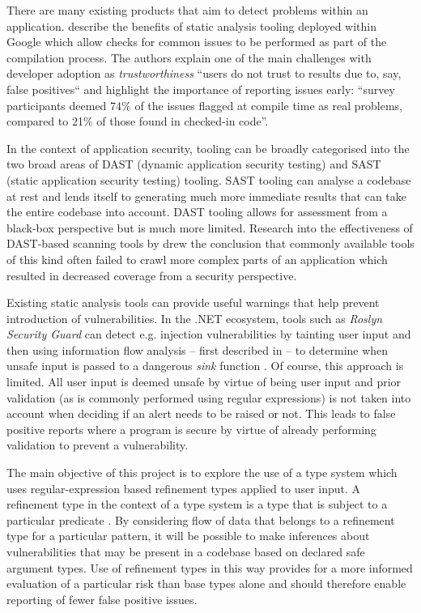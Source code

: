 \documentclass[a4paper,openany,12pt]{book}
\begin{document}
There are many existing products that aim to detect problems within an application. \citet{sadowski2018lessons} describe the benefits of static analysis tooling deployed within Google which allow checks for common issues to be performed as part of the compilation process. The authors explain one of the main challenges with developer adoption as \emph{trustworthiness} ``users do not trust to results due to, say, false positives`` and highlight the importance of reporting issues early: ``survey participants deemed 74\% of the issues flagged at compile time as real problems, compared to 21\% of those found in checked-in code''.

In the context of application security, tooling can be broadly categorised into the two broad areas of DAST (dynamic application security testing) and SAST (static application security testing) tooling. SAST tooling can analyse a codebase at rest and lends itself to generating much more immediate results that can take the entire codebase into account. DAST tooling allows for assessment from a black-box perspective but is much more limited. Research into the effectiveness of DAST-based scanning tools by \citet{doupe2010johnny} drew the conclusion that commonly available tools of this kind often failed to crawl more complex parts of an application which resulted in decreased coverage from a security perspective.

Existing static analysis tools can provide useful warnings that help prevent introduction of vulnerabilities.
In the .NET ecosystem, tools such as \emph{Roslyn Security Guard} can detect e.g. injection vulnerabilities by tainting
user input and then using information flow analysis -- first described in \cite{denning1977certification} -- to
determine when unsafe input is passed to a dangerous \emph{sink} function \citep{rosylynsecguard}.
Of course, this approach is limited.
All user input is deemed unsafe by virtue of being user input and prior validation (as is commonly performed using
regular expressions) is not taken into account when deciding if an alert needs to be raised or not.
This leads to false positive reports where a program is secure by virtue of already performing validation to prevent a
vulnerability.

The main objective of this project is to explore the use of a type system which uses regular-expression based refinement
types applied to user input.
A refinement type in the context of a type system is a type that is subject to a particular predicate \citep[p.
207]{benjaminpierce2002}.
By considering flow of data that belongs to a refinement type for a particular pattern, it will be possible to make
inferences about vulnerabilities that may be present in a codebase based on declared safe argument types.
Use of refinement types in this way provides for a more informed evaluation of a particular risk than base types alone
and should therefore enable reporting of fewer false positive issues.
\end{document}
